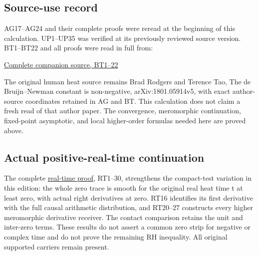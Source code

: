 \documentclass[
  10pt,
  a4paper,
]{article}
\begin{document}
\subsection{Source-use record}\label{source-use-record}

AG17--AG24 and their complete proofs were reread at the beginning of
this calculation. UP1--UP35 was verified at its previously reviewed
source version. BT1--BT22 and all proofs were read in full from:

\href{CONTACT_DEFECT_TRACE_VARIATION.tex}{Complete companion source,
BT1--22}

The original human heat source remains Brad Rodgers and Terence Tao, The
de Bruijn--Newman constant is non-negative, arXiv:1801.05914v5, with
exact author-source coordinates retained in AG and BT. This calculation
does not claim a fresh read of that author paper. The convergence,
meromorphic continuation, fixed-point asymptotic, and local higher-order
formulas needed here are proved above.

\subsection{Actual positive-real-time
continuation}\label{actual-positive-real-time-continuation}

The complete \href{REAL_TIME_HEAT_TRACE_DERIVATION.md}{real-time proof},
RT1--30, strengthens the compact-test variation in this edition: the
whole zero trace is smooth for the original real heat time t at least
zero, with actual right derivatives at zero. RT16 identifies its first
derivative with the full causal arithmetic distribution, and RT20--27
constructs every higher meromorphic derivative receiver. The contact
comparison retains the unit and inter-zero terms. These results do not
assert a common zero strip for negative or complex time and do not prove
the remaining RH inequality. All original supported carriers remain
present.
\end{document}
